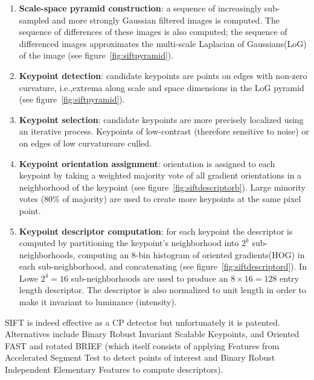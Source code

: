 \begin{framed}
	\begin{enumerate}
		\item \textbf{Scale-space pyramid construction}: a sequence of increasingly sub-sampled and more strongly Gaussian filtered images is computed. The sequence of differences of these images is also computed; the sequence of differenced images approximates the multi-scale Laplacian of Gaussians\footnotemark (LoG) of the image (see figure~\ref{fig:siftpyramid}).
		\item \textbf{Keypoint detection}: candidate keypoints are points on edges with non-zero curvature, i.e.,extrema along scale and space dimensions in the LoG pyramid (see figure~\ref{fig:siftpyramid}).
		\item \textbf{Keypoint selection}: candidate keypoints are more precisely localized using an iterative process. Keypoints of low-contrast (therefore sensitive to noise) or on edges of low curvature\footnotemark are culled.
		\item \textbf{Keypoint orientation assignment}: orientation is assigned to each keypoint by taking a weighted majority vote of all gradient orientations in a neighborhood of the keypoint (see figure~\ref{fig:siftdescriptorb}). Large minority votes (80\% of majority) are used to create more keypoints at the same pixel point.
		\item \textbf{Keypoint descriptor computation}: for each keypoint the descriptor is computed by partitioning the keypoint's neighborhood into \(2^k\) sub-neighborhoods, computing an 8-bin histogram of oriented gradients\footnotemark (HOG) in each sub-neighborhood, and concatenating (see figure~\ref{fig:siftdescriptord}). In Lowe \etal\cite{lowe2004distinctive} \(2^4=16\) sub-neighborhoods are used to produce an \(8\times16 = 128\) entry length descriptor. The descriptor is also normalized to unit length in order to make it invariant to luminance (intensity).
	\end{enumerate}
\end{framed}
\addtocounter{footnote}{-3}
{
	\makeatletter
	\renewcommand\@makefnmark{\hbox{\@textsuperscript{\normalfont\color{white}\@thefnmark}}}
	\renewcommand\@makefntext[1]{%
	  \parindent 1em\noindent
				\hb@xt@1.8em{%
					\hss\@textsuperscript{\normalfont\@thefnmark}}#1}
	\makeatother

}

SIFT is indeed effective as a CP detector but unfortunately it is patented.
%
Alternatives include Binary Robust Invariant Scalable Keypoints\cite{leutenegger2011brisk}, and Oriented FAST and rotated BRIEF\cite{rublee2011orb} (which itself consists of applying Features from Accelerated Segment Test\cite{rosten2006machine} to detect points of interest and Binary Robust Independent Elementary Features\cite{calonder2010brief} to compute descriptors).

